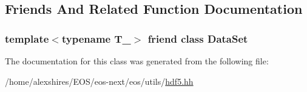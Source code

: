 \subsection{Friends And Related Function Documentation}
\hypertarget{classeos_1_1hdf5_1_1Attribute_aef648af6c56fa8ee0738c93629e725dc}{
\subsubsection[{DataSet}]{\setlength{\rightskip}{0pt plus 5cm}template$<$typename T\_\-$>$ friend class {\bf DataSet}}}
\label{classeos_1_1hdf5_1_1Attribute_aef648af6c56fa8ee0738c93629e725dc}


The documentation for this class was generated from the following file:\begin{DoxyCompactItemize}
\item 
/home/alexshires/EOS/eos-\/next/eos/utils/\hyperlink{hdf5_8hh}{hdf5.hh}\end{DoxyCompactItemize}
